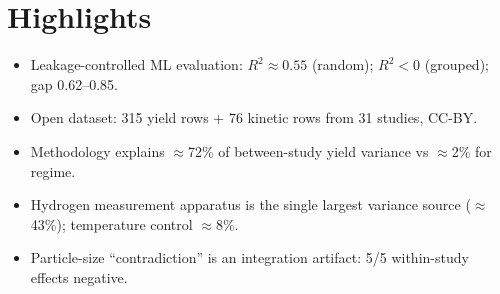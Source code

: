 \documentclass[preprint,12pt]{elsarticle}
\begin{document}
\section*{Highlights}
\begin{itemize}\setlength{\itemsep}{0pt}
  \item Leakage-controlled ML evaluation: $R^2\!\approx\!0.55$ (random); $R^2\!<\!0$ (grouped); gap 0.62--0.85.
  \item Open dataset: 315 yield rows + 76 kinetic rows from 31 studies, CC-BY.
  \item Methodology explains $\approx$72\% of between-study yield variance vs $\approx$2\% for regime.
  \item Hydrogen measurement apparatus is the single largest variance source ($\approx$43\%); temperature control $\approx$8\%.
  \item Particle-size ``contradiction'' is an integration artifact: 5/5 within-study effects negative.
\end{itemize}












\end{document}
